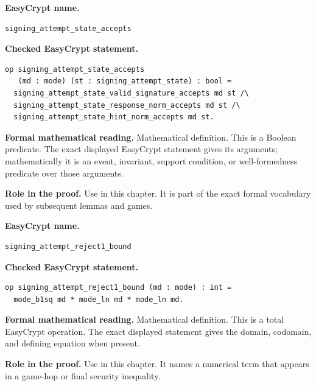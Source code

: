 \begin{formaldefinition}
\noindent\textbf{EasyCrypt name.}
\begin{lstlisting}[language=EasyCrypt,basicstyle=\ttfamily\scriptsize]
signing_attempt_state_accepts
\end{lstlisting}
\noindent\textbf{Checked EasyCrypt statement.}
\begin{lstlisting}[language=EasyCrypt,basicstyle=\ttfamily\scriptsize]
op signing_attempt_state_accepts
   (md : mode) (st : signing_attempt_state) : bool =
  signing_attempt_state_valid_signature_accepts md st /\
  signing_attempt_state_response_norm_accepts md st /\
  signing_attempt_state_hint_norm_accepts md st.
\end{lstlisting}
\noindent\textbf{Formal mathematical reading.}
Mathematical definition. This is a Boolean predicate.  The exact displayed EasyCrypt statement gives its arguments; mathematically it is an event, invariant, support condition, or well-formedness predicate over those arguments.

\noindent\textbf{Role in the proof.}
Use in this chapter. It is part of the exact formal vocabulary used by subsequent lemmas and games.

\end{formaldefinition}

\begin{formaldefinition}
\noindent\textbf{EasyCrypt name.}
\begin{lstlisting}[language=EasyCrypt,basicstyle=\ttfamily\scriptsize]
signing_attempt_reject1_bound
\end{lstlisting}
\noindent\textbf{Checked EasyCrypt statement.}
\begin{lstlisting}[language=EasyCrypt,basicstyle=\ttfamily\scriptsize]
op signing_attempt_reject1_bound (md : mode) : int =
  mode_b1sq md * mode_ln md * mode_ln md.
\end{lstlisting}
\noindent\textbf{Formal mathematical reading.}
Mathematical definition. This is a total EasyCrypt operation.  The exact displayed statement gives the domain, codomain, and defining equation when present.

\noindent\textbf{Role in the proof.}
Use in this chapter. It names a numerical term that appears in a game-hop or final security inequality.

\end{formaldefinition}

